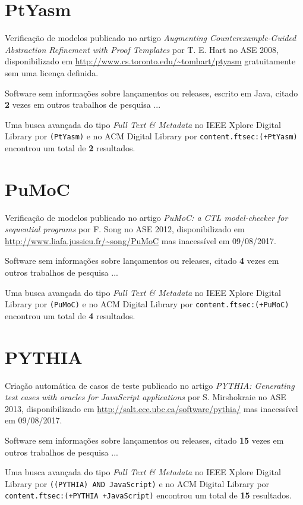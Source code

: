 \section{PtYasm}

Verificação de modelos
publicado no artigo {\it Augmenting Counterexample-Guided Abstraction Refinement with Proof Templates}
por T. E. Hart
no ASE 2008,
disponibilizado em \url{http://www.cs.toronto.edu/~tomhart/ptyasm}
gratuitamente
sem uma licença definida.

Software sem informações sobre lançamentos ou releases,
escrito em Java,
citado {\bf 2} vezes em outros trabalhos de pesquisa ...

Uma busca avançada do tipo {\it Full Text \& Metadata} no IEEE Xplore Digital Library por
\texttt{(PtYasm)}
e no ACM Digital Library por
\texttt{content.ftsec:(+PtYasm)}
encontrou um total de
{\bf 2}
resultados.

\section{PuMoC}

Verificação de modelos
publicado no artigo {\it PuMoC: a CTL model-checker for sequential programs}
por F. Song
no ASE 2012,
disponibilizado em \url{http://www.liafa.jussieu.fr/~song/PuMoC}
mas inacessível em 09/08/2017.

Software sem informações sobre lançamentos ou releases,
citado {\bf 4} vezes em outros trabalhos de pesquisa ...

Uma busca avançada do tipo {\it Full Text \& Metadata} no IEEE Xplore Digital Library por
\texttt{(PuMoC)}
e no ACM Digital Library por
\texttt{content.ftsec:(+PuMoC)}
encontrou um total de
{\bf 4}
resultados.

\section{PYTHIA}

Criação automática de casos de teste
publicado no artigo {\it PYTHIA: Generating test cases with oracles for JavaScript applications}
por S. Mirshokraie
no ASE 2013,
disponibilizado em \url{http://salt.ece.ubc.ca/software/pythia/}
mas inacessível em 09/08/2017.

Software sem informações sobre lançamentos ou releases,
citado {\bf 15} vezes em outros trabalhos de pesquisa ...

Uma busca avançada do tipo {\it Full Text \& Metadata} no IEEE Xplore Digital Library por
\texttt{((PYTHIA) AND JavaScript)}
e no ACM Digital Library por
\texttt{content.ftsec:(+PYTHIA +JavaScript)}
encontrou um total de
{\bf 15}
resultados.

